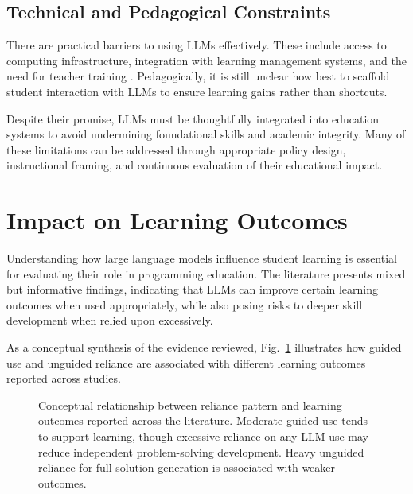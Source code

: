 \documentclass[10pt,journal,compsoc]{IEEEtran}
\begin{document}
\subsection{Technical and Pedagogical Constraints}
There are practical barriers to using LLMs effectively. These include access to computing infrastructure, integration with learning management systems, and the need for teacher training \cite{educsci13121216}. Pedagogically, it is still unclear how best to scaffold student interaction with LLMs to ensure learning gains rather than shortcuts.

Despite their promise, LLMs must be thoughtfully integrated into education systems to avoid undermining foundational skills and academic integrity. Many of these limitations can be addressed through appropriate policy design, instructional framing, and continuous evaluation of their educational impact.


\section{Impact on Learning Outcomes}
\label{sec:impact}
Understanding how large language models influence student learning is essential for evaluating their role in programming education. The literature presents mixed but informative findings, indicating that LLMs can improve certain learning outcomes when used appropriately, while also posing risks to deeper skill development when relied upon excessively.

As a conceptual synthesis of the evidence reviewed, Fig.~\ref{fig:llm_reliance_outcomes} illustrates how guided use and unguided reliance are associated with different learning outcomes reported across studies.

\begin{figure}[t]
\centering
{}
\caption{Conceptual relationship between reliance pattern and learning outcomes reported across the literature. Moderate guided use tends to support learning, though excessive reliance on any LLM use may reduce independent problem-solving development. Heavy unguided reliance for full solution generation is associated with weaker outcomes.}
\label{fig:llm_reliance_outcomes}
\end{figure}
\end{document}
